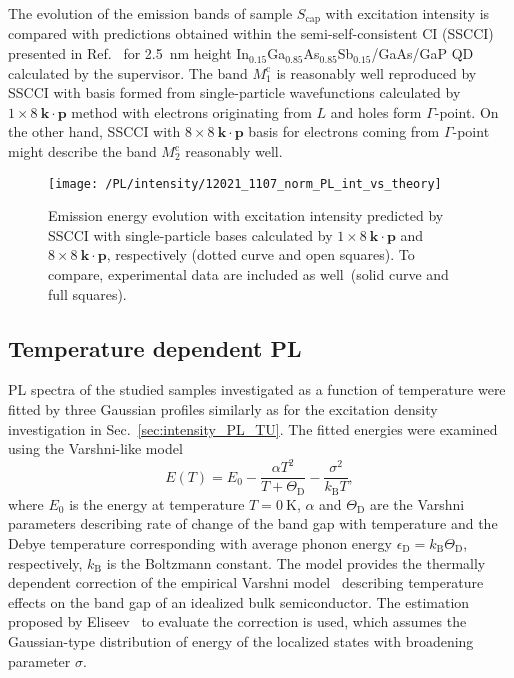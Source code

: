 The evolution of the emission bands of sample $S_\mathrm{cap}$ with excitation intensity is compared with predictions obtained within the semi-self-consistent CI (SSCCI) presented in Ref.~\citep{Klenovsky2017} %
for 2.5~nm height In$_{0.15}$Ga$_{0.85}$As$_{0.85}$Sb$_{0.15}$/GaAs/GaP QD calculated by the supervisor. The band $M_1^\mathrm{c}$ is reasonably well reproduced by SSCCI with basis formed from single-particle wavefunctions calculated by $1\times8~\mathbf{k \cdot p}$ method with electrons originating from $L$ and holes form $\Gamma$-point. On the other hand, SSCCI with $8\times8~\mathbf{k \cdot p}$ basis for electrons coming from $\Gamma$-point might describe the band $M_2^\mathrm{c}$ reasonably well. {}
%
\begin{figure}
	\centering
	\texttt{[image: /PL/intensity/12021\_1107\_norm\_PL\_int\_vs\_theory]}
	\caption{Emission energy evolution with excitation intensity predicted by SSCCI with single-particle bases calculated by $1\times8~\mathbf{k \cdot p}$ and $8\times8~\mathbf{k \cdot p}$, respectively (dotted curve and open squares). To compare, experimental data are included as well~(solid curve and full squares).}
	\label{fig:QD_cap_int_expvstheory}
\end{figure}

\newpage
\subsection{Temperature dependent PL}
\label{Sec:temp_PL_TU}
PL spectra of the studied samples investigated as a function of temperature were fitted by three Gaussian profiles similarly as for the excitation density investigation in Sec.~\ref{sec:intensity_PL_TU}. The fitted energies were examined using the Varshni-like model
%
\begin{equation}
E(T)=E_0-\frac{\alpha T^2}{T+\Theta_\mathrm{D}}-\frac{\sigma^2}{k_\mathrm{B}T}, \label{eq:Varshni-like}
\end{equation}
where $E_0$ is the energy at temperature $T=0~\mathrm{K}$, $\alpha$ and $\Theta_\mathrm{D}$ are the Varshni parameters describing rate of change of the band gap with temperature and the Debye temperature corresponding with average phonon energy $\epsilon_\mathrm{D}=k_\mathrm{B}\Theta_\mathrm{D}$, respectively, $k_\mathrm{B}$ is the Boltzmann constant. The model provides the thermally dependent correction of the empirical Varshni model~\citep{Varshni} describing temperature effects on the band gap of an idealized bulk semiconductor. The estimation proposed by Eliseev~\citep{Eliseev_apl2003_PLtemp} to evaluate the correction is used, which assumes the Gaussian-type distribution of energy of the localized states with broadening parameter $\sigma$.

